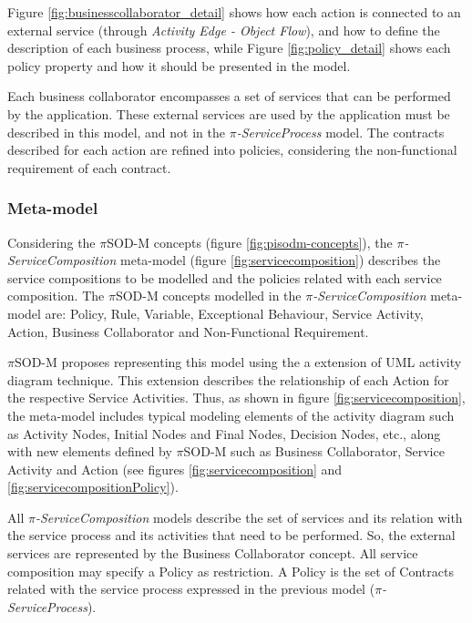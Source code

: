 Figure \ref{fig:businesscollaborator_detail} shows how each action is connected to an external service
(through \textit{Activity Edge - Object Flow}), and how to define the
description of each business process, while Figure  \ref{fig:policy_detail} shows each
policy property and how it should be presented in the model. 

Each business collaborator encompasses a set of services that can
be performed by the application. These external services are used by the 
application must be described in this model, and not in the
\textit{$\pi$-ServiceProcess} model. The contracts described for each action are
refined into policies, considering the non-functional requirement of each
contract.



 \subsubsection{Meta-model} 
 
 

Considering the $\pi$SOD-M concepts (figure \ref{fig:pisodm-concepts}), the
\textit{$\pi$-ServiceComposition} meta-model (figure
\ref{fig:servicecomposition}) describes the service compositions
to be modelled and the policies related with each service composition.
The $\pi$SOD-M concepts modelled in the \textit{$\pi$-ServiceComposition}
meta-model are: {\sc Policy, Rule, Variable, Exceptional Behaviour, Service
Activity, Action, Business Collaborator} and {\sc Non-Functional
Requirement}.

 $\pi$SOD-M proposes representing this model using the a extension of UML
 activity diagram technique. This extension describes the relationship of each {\sc Action} for the
respective {\sc Service Activities}. Thus, as shown in figure
\ref{fig:servicecomposition}, the meta-model includes typical modeling elements
of the activity diagram such as {\sc Activity Nodes}, {\sc Initial
Nodes} and {\sc Final Nodes}, {\sc Decision Nodes}, etc., along with
new elements defined by $\pi$SOD-M such as {\sc Business Collaborator},
{\sc Service Activity} and {\sc Action} (see
figures \ref{fig:servicecomposition} and \ref{fig:servicecompositionPolicy}).

All \textit{$\pi$-ServiceComposition} models
describe the set of services and its relation with the service process and its
activities that need to be performed. So, the external services
are represented by the {\sc Business Collaborator} concept. All service
composition may specify a {\sc Policy} as restriction. A {\sc Policy} is the
set of {\sc Contracts} related with the service process expressed in the
previous model (\textit{$\pi$-ServiceProcess}).

